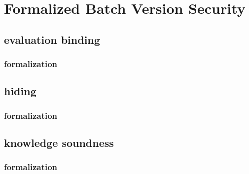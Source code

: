 \chapter{Formalized Batch Version Security}\label{chapter:batch_security}

\section{evaluation binding}

\subsection{formalization}

\section{hiding}

\subsection{formalization}

\section{knowledge soundness}

\subsection{formalization}